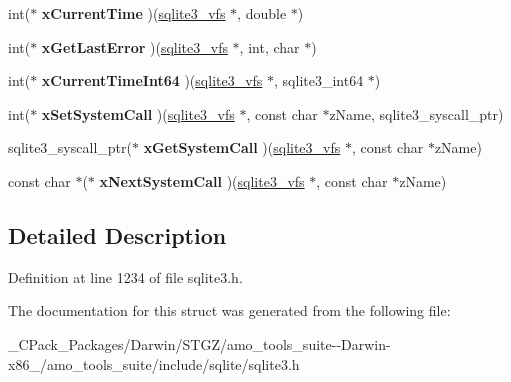 \begin{DoxyCompactItemize}
int($\ast$ {\bfseries x\+Current\+Time} )(\hyperlink{structsqlite3__vfs}{sqlite3\+\_\+vfs} $\ast$, double $\ast$)
\item 
\mbox{\label{structsqlite3__vfs_a4994110c79d082f7770ce553d507748f}} 
int($\ast$ {\bfseries x\+Get\+Last\+Error} )(\hyperlink{structsqlite3__vfs}{sqlite3\+\_\+vfs} $\ast$, int, char $\ast$)
\item 
\mbox{\label{structsqlite3__vfs_aa281584c422969b7f0df0e5f918fc590}} 
int($\ast$ {\bfseries x\+Current\+Time\+Int64} )(\hyperlink{structsqlite3__vfs}{sqlite3\+\_\+vfs} $\ast$, sqlite3\+\_\+int64 $\ast$)
\item 
\mbox{\label{structsqlite3__vfs_a69996d40229d6eabe6869bb3fc80b730}} 
int($\ast$ {\bfseries x\+Set\+System\+Call} )(\hyperlink{structsqlite3__vfs}{sqlite3\+\_\+vfs} $\ast$, const char $\ast$z\+Name, sqlite3\+\_\+syscall\+\_\+ptr)
\item 
\mbox{\label{structsqlite3__vfs_a604384e58c645e06b6db38d8a45e1103}} 
sqlite3\+\_\+syscall\+\_\+ptr($\ast$ {\bfseries x\+Get\+System\+Call} )(\hyperlink{structsqlite3__vfs}{sqlite3\+\_\+vfs} $\ast$, const char $\ast$z\+Name)
\item 
\mbox{\label{structsqlite3__vfs_ac2930d34749977f39b1bbc27dc1de2b2}} 
const char $\ast$($\ast$ {\bfseries x\+Next\+System\+Call} )(\hyperlink{structsqlite3__vfs}{sqlite3\+\_\+vfs} $\ast$, const char $\ast$z\+Name)
\end{DoxyCompactItemize}


\subsection{Detailed Description}


Definition at line 1234 of file sqlite3.\+h.



The documentation for this struct was generated from the following file\+:\begin{DoxyCompactItemize}
\item 
\+\_\+\+C\+Pack\+\_\+\+Packages/\+Darwin/\+S\+T\+G\+Z/amo\+\_\+tools\+\_\+suite-\/-\/\+Darwin-\/x86\+\_/amo\+\_\+tools\+\_\+suite/include/sqlite/sqlite3.\+h\end{DoxyCompactItemize}
